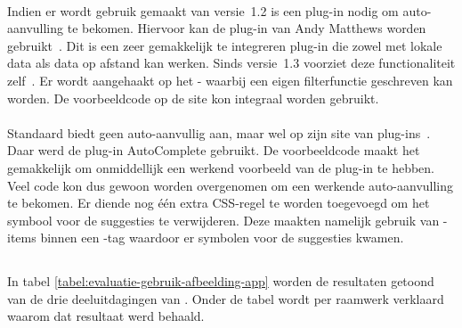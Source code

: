 \paragraph{\jqm}
Indien er wordt gebruik gemaakt van versie~1.2 is een plug-in nodig om auto-aanvulling te bekomen.
Hiervoor kan de plug-in van Andy Matthews worden gebruikt~\cite{Matthews2013}. 
Dit is een zeer gemakkelijk te integreren plug-in die zowel met lokale data als data op afstand kan werken.
Sinds versie~1.3 voorziet \jqm{} deze functionaliteit zelf~\cite{JQuery2013c}.
Er wordt aangehaakt op het - waarbij een eigen filterfunctie geschreven kan worden.
De voorbeeldcode op de site kon integraal worden gebruikt. 

\paragraph{\lungo}
Standaard biedt \lungo{} geen auto-aanvullig aan, maar wel op zijn site van plug-ins~\cite{TapQuo2013b}.
Daar werd de plug-in AutoComplete gebruikt.
De voorbeeldcode maakt het gemakkelijk om onmiddellijk een werkend voorbeeld van de plug-in te hebben.
Veel code kon dus gewoon worden overgenomen om een werkende auto-aanvulling te bekomen.
Er diende nog één extra CSS-regel te worden toegevoegd om het symbool voor de suggesties te verwijderen.
Deze maakten namelijk gebruik van -items binnen een -tag waardoor er symbolen voor de suggesties kwamen.



\subsection{}
\label{sec:evaluatie-gebruik-afbeelding-app}

In tabel \ref{tabel:evaluatie-gebruik-afbeelding-app} worden de resultaten getoond van de drie deeluitdagingen van .
Onder de tabel wordt per raamwerk verklaard waarom dat resultaat werd behaald.


